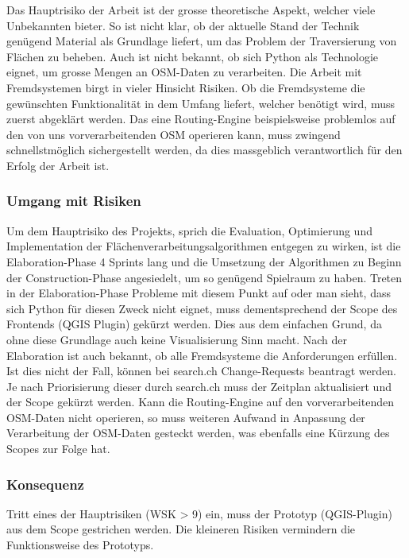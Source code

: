 Das Hauptrisiko der Arbeit ist der grosse theoretische Aspekt, welcher viele Unbekannten bieter. So ist nicht klar, ob der aktuelle Stand der Technik genügend Material als Grundlage liefert, um das Problem der Traversierung von Flächen zu beheben. Auch ist nicht bekannt, ob sich Python als Technologie eignet, um grosse Mengen an \ac{OSM}-Daten zu verarbeiten. Die Arbeit mit Fremdsystemen birgt in vieler Hinsicht Risiken. Ob die Fremdsysteme die gewünschten Funktionalität in dem Umfang liefert, welcher benötigt wird, muss zuerst abgeklärt werden. Das eine Routing-Engine beispielsweise problemlos auf den von uns vorverarbeitenden \ac{OSM} operieren kann, muss zwingend schnellstmöglich sichergestellt werden, da dies massgeblich verantwortlich für den Erfolg der Arbeit ist.

\subsubsection{Umgang mit Risiken}
\label{Risiken:Umang mit Risiken}
Um dem Hauptrisiko des Projekts, sprich die Evaluation, Optimierung und Implementation der Flächenverarbeitungsalgorithmen entgegen zu wirken, ist die Elaboration-Phase 4 Sprints lang und die Umsetzung der Algorithmen zu Beginn der Construction-Phase angesiedelt, um so genügend Spielraum zu haben. Treten in der Elaboration-Phase Probleme mit diesem Punkt auf oder man sieht, dass sich Python für diesen Zweck nicht eignet, muss dementsprechend der Scope des Frontends (QGIS Plugin) gekürzt werden. Dies aus dem einfachen Grund, da ohne diese Grundlage auch keine Visualisierung Sinn macht. Nach der Elaboration ist auch bekannt, ob alle Fremdsysteme die Anforderungen erfüllen. Ist dies nicht der Fall, können bei search.ch \cite{search_ch_route_api} Change-Requests beantragt werden. Je nach Priorisierung dieser durch search.ch muss der Zeitplan aktualisiert und der Scope gekürzt werden. Kann die Routing-Engine auf den vorverarbeitenden \ac{OSM}-Daten nicht operieren, so muss weiteren Aufwand in Anpassung der Verarbeitung der \ac{OSM}-Daten gesteckt werden, was ebenfalls eine Kürzung des Scopes zur Folge hat.

\subsubsection{Konsequenz}
\label{Risiken:Konsequenz}
Tritt eines der Hauptrisiken (WSK > 9) ein, muss der Prototyp (QGIS-Plugin) aus dem Scope gestrichen werden. Die kleineren Risiken vermindern die Funktionsweise des Prototyps.

